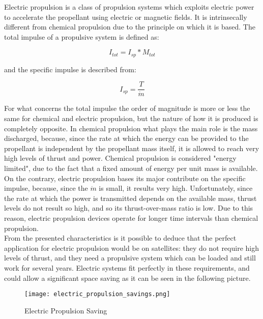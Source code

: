 \documentclass[a4paper]{report}
\begin{document}
Electric propulsion is a class of propulsion systems which exploits electric power to accelerate the propellant using electric or magnetic fields. It is intrinsecally different from chemical propulsion due to the principle on which it is based. The total impulse of a propulsive system is defined as: 

\begin{equation}
I_{tot}=I_{sp}*M_{tot}
\end{equation}

and the specific impulse is described from:

\begin{equation}
I_{sp}=\frac{T}{\dot{m}}
\end{equation}

For what concerns the total impulse the order of magnitude is more or less the same for chemical and electric propulsion, but the nature of how it is produced is completely opposite. In chemical propulsion what plays the main role is the mass discharged, because, since the rate at which the energy can be provided to the propellant is independent by the propellant mass itself, it is allowed to reach very high levels of thrust and power. Chemical propulsion is considered "energy limited", due to the fact that a fixed amount of energy per unit mass is available. On the contrary, electric propulsion bases its major contribute on the specific impulse, because, since the $\dot{m}$ is small, it results very high. Unfortunately, since the rate at which the power is transmitted depends on the available mass, thrust levels do not result so high, and so its thrust-over-mass ratio is low. Due to this reason, electric propulsion devices operate for longer time intervals than chemical propulsion. \\ %
From the presented characteristics is it possible to deduce that the perfect application for electric propulsion would be on satellites: they do not require high levels of thrust, and they need a propulsive system which can be loaded and still work for several years. Electric systems fit perfectly in these requirements, and could allow a significant space saving as it can be seen in the following picture. \\ %

\begin{figure}[H]
\centering
\texttt{[image: electric\_propulsion\_savings.png]}
\caption{Electric Propulsion Saving}
\end{figure}
\end{document}
